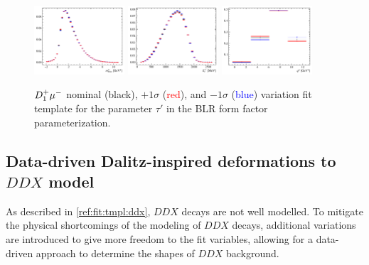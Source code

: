 \begin{figure}[!htb]
    \includegraphics[width=0.3\textwidth]{./figs-fit-fit-variations/D0_iso_D1ststMu__vs__D0_iso_D1ststMu_u1m__vs__D0_iso_D1ststMu_u1p__m2miss.pdf}
    \includegraphics[width=0.3\textwidth]{./figs-fit-fit-variations/D0_iso_D1ststMu__vs__D0_iso_D1ststMu_u1m__vs__D0_iso_D1ststMu_u1p__el.pdf}
    \includegraphics[width=0.3\textwidth]{./figs-fit-fit-variations/D0_iso_D1ststMu__vs__D0_iso_D1ststMu_u1m__vs__D0_iso_D1ststMu_u1p__q2.pdf}

    \caption{
        $D_1^+{\mu^-}$ nominal (black),
        $+ 1\sigma$ (\textcolor{red}{red}),
        and
        $- 1\sigma$ (\textcolor{blue}{blue})
        variation fit template for
        the parameter $\tau'$
        in the BLR form factor parameterization.
    }
    \label{fig:fit-variations:ff}
\end{figure}


\subsection{Data-driven Dalitz-inspired deformations to $DDX$ model}
\label{ref:fit:var:ddx}

As described in \cref{ref:fit:tmpl:ddx}, $DDX$ decays are not well modelled.
To mitigate the physical shortcomings of the modeling of $DDX$ decays,
additional variations are introduced to give more freedom to the fit variables,
allowing for a data-driven approach to determine the shapes of $DDX$ background.

